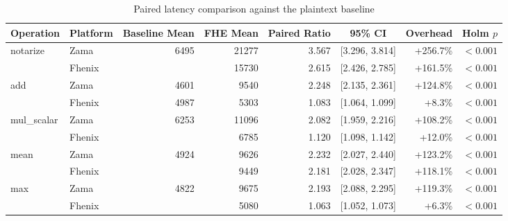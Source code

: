 \begin{table}[!t]
\caption{Paired latency comparison against the plaintext baseline}
\label{tab:paired-lifecycle-comparison}
\centering
\footnotesize
\setlength{\tabcolsep}{5pt}
\begin{tabular}{|l|l|r|r|r|c|r|r|}
\hline
\textbf{Operation} &
\textbf{Platform} &
\textbf{Baseline Mean} &
\textbf{FHE Mean} &
\textbf{Paired Ratio} &
\textbf{95\% CI} &
\textbf{Overhead} &
\textbf{Holm \(p\)} \\
\hline


\multirow{2}{*}{notarize}
& Zama & \multirow{2}{*}{6495} & 21277 & 3.567 & [3.296, 3.814] & +256.7\% & $<0.001$ \\
& Fhenix & & 15730 & 2.615 & [2.426, 2.785] & +161.5\% & $<0.001$ \\
\hline

\multirow{2}{*}{add}
& Zama & 4601 & 9540 & 2.248 & [2.135, 2.361] & +124.8\% & $<0.001$ \\
& Fhenix & 4987 & 5303 & 1.083 & [1.064, 1.099] & +8.3\% & $<0.001$ \\
\hline

\multirow{2}{*}{mul\_scalar}
& Zama & \multirow{2}{*}{6253} & 11096 & 2.082 & [1.959, 2.216] & +108.2\% & $<0.001$ \\
& Fhenix & & 6785 & 1.120 & [1.098, 1.142] & +12.0\% & $<0.001$ \\
\hline

\multirow{2}{*}{mean}
& Zama & \multirow{2}{*}{4924} & 9626 & 2.232 & [2.027, 2.440] & +123.2\% & $<0.001$ \\
& Fhenix & & 9449 & 2.181 & [2.028, 2.347] & +118.1\% & $<0.001$ \\
\hline

\multirow{2}{*}{max}
& Zama & \multirow{2}{*}{4822} & 9675 & 2.193 & [2.088, 2.295] & +119.3\% & $<0.001$ \\
& Fhenix & & 5080 & 1.063 & [1.052, 1.073] & +6.3\% & $<0.001$ \\
\hline
\end{tabular}
\end{table}

